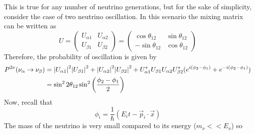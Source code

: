 This is true for any number of neutrino generations, but for the sake of simplicity, consider the case of two neutrino oscillation. In this scenario the mixing matrix can be written as 
\begin{equation}	
U = 
\begin{pmatrix}
U_{\alpha 1} & U_{\alpha 2} \\
U_{\beta 1} & U_{\beta 2}
\end{pmatrix} = 
\begin{pmatrix}
\cos\theta_{12} & \sin\theta_{12} \\
-\sin\theta_{12} & \cos\theta_{12}
\end{pmatrix}
\end{equation}
Therefore, the probability of oscillation is given by
\begin{equation}
\begin{split}
P^{2\nu}(\nu_\alpha \rightarrow \nu_\beta) 
&=  \abs{U_{\alpha 1}}^{2}\abs{U_{\beta 1}}^2 + \abs{U_{\alpha 2}}^2\abs{U_{\beta 2}}^2 +
U^{*}_{\alpha 1}U_{\beta 1}U_{\alpha 2}U^{*}_{\beta 2}(e^{i(\phi_2-\phi_1)} + e^{-i(\phi_2 - \phi_1)}) \\ 
&= \sin^22\theta_{12}\sin^2\left(\frac{\phi_2-\phi_1}{2}\right)
\end{split}
\end{equation}
Now, recall that 
\begin{equation}
	\phi_i = \frac{1}{\hbar}(E_{i}t - \vec{p}_{i}\cdot\vec{x})
\end{equation}
The mass of the neutrino is very small compared to its energy ($m_\nu << E_\nu$) so 
